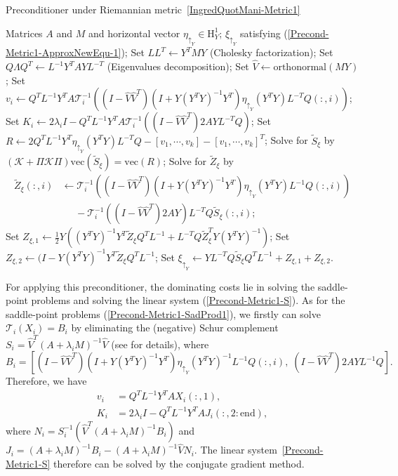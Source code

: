 \documentclass[11pt]{article}
\newcommand{\whcomm}[2]{{\sf\color{purple} #1}{\sf\color{blue} #2}}
\numberwithin{equation}{section}
\begin{document}
\begin{algorithm}[htbp]
  \caption{Preconditioner under Riemannian metric~\eqref{IngredQuotMani-Metric1}} 
  \begin{algorithmic}[1] \label{Precond-Metric1-Alg}
  \REQUIRE Matrices $A$ and $M$ and horizontal vector $\eta_{\uparrow_Y}\in\mathrm{H}_Y^1$;
  \ENSURE $\xi_{\uparrow_Y}$ satisfying (\ref{Precond-Metric1-ApproxNewEqu-1});
  \STATE Set $LL^T\gets Y^TMY$ (Cholesky factorization);
  \STATE Set $Q\Lambda Q^T\gets L^{-1}Y^TAYL^{-T}$ (Eigenvalues decomposition); 
  \STATE Set $\hat{V}\gets \mathrm{orthonormal}(MY)$;
  \STATE Set $v_i\gets Q^TL^{-1}Y^TA\mathcal{T}_i^{-1}\left( (I-\hat{V}\hat{V}^T)(I+Y(Y^TY)^{-1}Y^T)\eta_{\uparrow_Y}(Y^TY)L^{-T}Q(:,i)\right)$;
  \STATE Set $K_i\gets 2\lambda_iI-Q^TL^{-1}Y^TA\mathcal{T}_i^{-1}\left( (I-\hat{V}\hat{V}^T)2AYL^{-T}Q\right)$;
  \STATE Set $R\gets 2Q^TL^{-1}Y^T\eta_{\uparrow_Y}(Y^TY)L^{-T}Q-[v_1,\cdots,v_k]-[v_1,\cdots,v_k]^T$;
  \STATE Solve for $\tilde{S}_\xi$ by $(\mathcal{K}+\Pi\mathcal{K}\Pi)\mathrm{vec}(\tilde{S}_\xi)=\mathrm{vec}(R)$;
  \STATE Solve for $\tilde{Z}_\xi$ by  
  {\small
  \begin{align*}
  \tilde{Z}_\xi (:, i)&\gets \mathcal{T}_i^{-1}\left((I-\hat{V}\hat{V}^T)(I+Y(Y^TY)^{-1}Y^T)\eta_{\uparrow_Y}(Y^TY)L^{-1}Q(:,i)\right) \\ & \;\;\;\;\; - \mathcal{T}_i^{-1}\left((I-\hat{V}\hat{V}^T)2AY\right)L^{-T}Q\tilde{S}_\xi(:,i);
  \end{align*}
  }
  \STATE Set $Z_{\xi,1}\gets \frac{1}{2}Y\left( (Y^TY)^{-1}Y^T\tilde{Z}_\xi Q^TL^{-1} + L^{-T}Q\tilde{Z}_{\xi}^TY(Y^TY)^{-1}  \right)$;
  \STATE Set $Z_{\xi,2}\gets (I - Y(Y^TY)^{-1}Y^T\tilde{Z}_{\xi}Q^TL^{-1}$;
  \STATE Set $\xi_{\uparrow_Y}\gets YL^{-T}Q\tilde{S}_\xi Q^TL^{-1}+ Z_{\xi,1} + Z_{\xi,2}$.
  
 \end{algorithmic}
\end{algorithm}

For applying this preconditioner, the dominating costs lie in solving the saddle-point problems and solving the linear system (\ref{Precond-Metric1-S}). As for the saddle-point problems (\ref{Precond-Metric1-SadProd1}), we firstly can solve $\mathcal{T}_i(X_i)=B_i$ by eliminating the (negative) Schur complement $S_i=\hat{V}^T(A+\lambda_iM)^{-1}\hat{V}$ (see \cite{benzi_numerical_2005} for details), where $$ B_i=[(I-\hat{V}\hat{V}^T)(I+Y(Y^TY)^{-1}Y^T)\eta_{\uparrow_Y}(Y^TY)^{-1}L^{-1}Q(:,i),\;(I-\hat{V}\hat{V}^T)2AYL^{-1}Q].
$$ 
Therefore, we have
\begin{align*} 
v_i &= Q^{T}L^{-1}Y^TAX_i(:,1), \\ 
K_i &= 2\lambda_iI- Q^TL^{-1}Y^TA J_i(:,2:\text{end}),
\end{align*}
where $N_i = S_i^{-1}(\hat{V}^T(A+\lambda_iM)^{-1}B_i)$ and $J_i=(A+\lambda_iM)^{-1}B_i - (A+\lambda_iM)^{-1}\hat{V}N_i$. The linear system~\eqref{Precond-Metric1-S} therefore can be solved by the conjugate gradient method.
\end{document}
